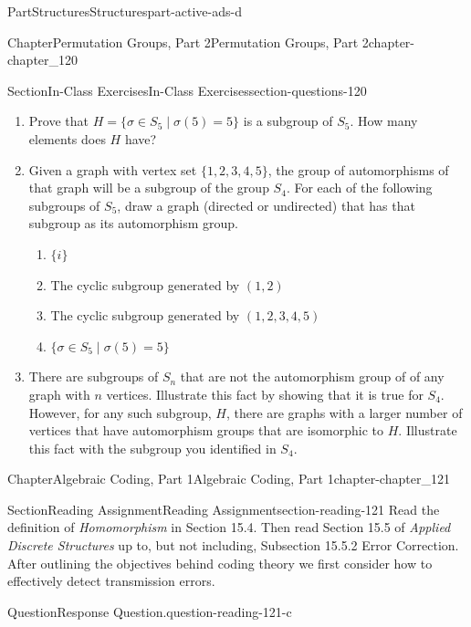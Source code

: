 \documentclass[oneside,10pt,]{book}
\numberwithin{equation}{section}
\begin{document}
\begin{partptx}{Part}{Structures}{}{Structures}{}{}{part-active-ads-d}
\begin{chapterptx}{Chapter}{Permutation Groups, Part 2}{}{Permutation Groups, Part 2}{}{}{chapter-chapter_120}
\begin{sectionptx}{Section}{In-Class Exercises}{}{In-Class Exercises}{}{}{section-questions-120}
\begin{enumerate}[label=\arabic*.]
\item{}Prove that \(H =\{\sigma \in S_5 \mid \sigma(5)=5 \}\) is a subgroup of \(S_5\).  How many elements does \(H\) have?%
\item{}Given a graph with vertex set \(\{1, 2, 3, 4, 5\}\), the group of automorphisms of that graph will be a subgroup of the group  \(S_4\). For each of the following subgroups of \(S_5\), draw a graph (directed or undirected) that has that subgroup as its automorphism group.%
\begin{enumerate}[label=(\alph*)]
\item{}\(\displaystyle \{i\}\)%
\item{}The cyclic subgroup generated by \((1,2)\)%
\item{}The cyclic subgroup generated by \((1,2,3,4,5)\)%
\item{}\(\displaystyle \{\sigma \in S_5 \mid \sigma(5)=5  \}\)%
\end{enumerate}
%
\item{}There are subgroups of \(S_n\) that are not the automorphism group of of any graph with \(n\) vertices.  Illustrate this fact by showing that it is true for \(S_4\).  However, for any such subgroup, \(H\), there are graphs with a larger number of vertices that have automorphism groups that are isomorphic to \(H\). Illustrate this fact with the subgroup you identified in \(S_4\).%
\end{enumerate}
%
\end{sectionptx}
\end{chapterptx}
%
\typeout{************************************************}
\typeout{************************************************}
%
\begin{chapterptx}{Chapter}{Algebraic Coding, Part 1}{}{Algebraic Coding, Part 1}{}{}{chapter-chapter_121}
\renewcommand*{\chaptername}{Chapter}
\index{}%
%
%
\typeout{************************************************}
\typeout{************************************************}
%
\begin{sectionptx}{Section}{Reading Assignment}{}{Reading Assignment}{}{}{section-reading-121}
Read the definition of \emph{Homomorphism} in Section 15.4. Then read Section 15.5 of \emph{Applied Discrete Structures} up to, but not including, Subsection 15.5.2 Error Correction. After outlining the objectives behind coding theory we first consider how to effectively detect transmission errors.%
\begin{question}{Question}{Response Question.}{question-reading-121-c}%

\end{question}
\end{sectionptx}
\end{chapterptx}
\end{partptx}
\end{document}
